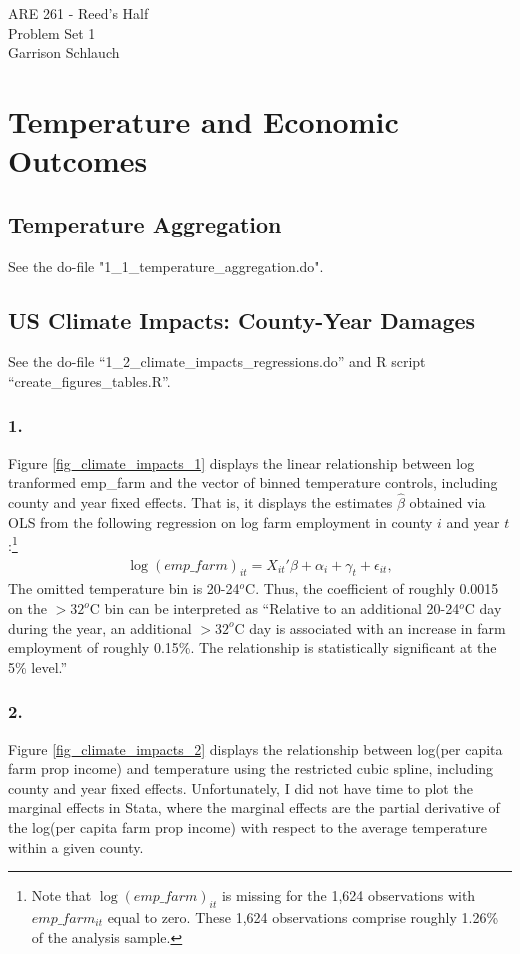 \documentclass[12pt]{article}
\begin{document}
\begin{center}
ARE 261 - Reed's Half \\
Problem Set 1 \\
Garrison Schlauch
\end{center}

\section{Temperature and Economic Outcomes}

\subsection{Temperature Aggregation}
See the do-file "1_1_temperature_aggregation.do".

\subsection{US Climate Impacts: County-Year Damages}
See the do-file ``1_2_climate_impacts_regressions.do'' and R script ``create_figures_tables.R''.

\subsubsection*{1.}
Figure \ref{fig_climate_impacts_1} displays the linear relationship between log tranformed emp\_farm and the vector of binned temperature controls, including county and year fixed effects. That is, it displays the estimates $\hat{\beta}$ obtained via OLS from the following regression on log farm employment in county $i$ and year $t$:\footnote{Note that $\log(emp\_farm)_{it}$ is missing for the 1,624 observations with $emp\_farm_{it}$ equal to zero. These 1,624 observations comprise roughly 1.26\% of the analysis sample.}
\begin{align*}
	\log(emp\_farm)_{it} = X_{it}' \beta + \alpha_i + \gamma_t + \epsilon_{it},
\end{align*}
The omitted temperature bin is 20-24$^o$C. Thus, the coefficient of roughly 0.0015 on the $>32^o$C bin can be interpreted as ``Relative to an additional 20-24$^o$C day during the year, an additional $>32^o$C day is associated with an increase in farm employment of roughly 0.15\%. The relationship is statistically significant at the 5\% level.''

\subsubsection*{2.}
Figure \ref{fig_climate_impacts_2} displays the relationship between log(per capita farm prop income) and temperature using the restricted cubic spline, including county and year fixed effects. Unfortunately, I did not have time to plot the marginal effects in Stata, where the marginal effects are the partial derivative of the log(per capita farm prop income) with respect to the average temperature within a given county.
\end{document}
